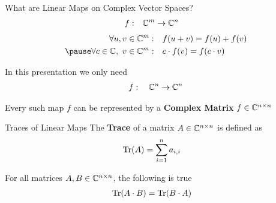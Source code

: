 %

\begin{frame}{What are Linear Maps on Complex Vector Spaces?}
    \Large
    \begin{align*}
        f: \quad & \mathbb{C}^m \to \mathbb{C}^n
    \end{align*}
    \large
    \pause
    \begin{align*}
        \forall u, v \in \C^m: \quad & f(u + v) = f(u) + f(v) \\ \pause
        \forall c \in \C,\ v \in \C^m: \quad & c \cdot f(v) = f(c \cdot v)
    \end{align*}
    
    \pause
    In this presentation we only need
    \Large
    \begin{align*}
        f: \quad \mathbb{C}^n \to \mathbb{C}^n
    \end{align*}

    \large
    \pause
    Every such map $f$ can be represented by a \textbf{Complex Matrix} $f \in \mathbb{C}^{n \times n}$
    \vspace{2em}
\end{frame}

\begin{frame}{Traces of Linear Maps}
    The \textbf{Trace} of a matrix $A \in \mathbb{C}^{n \times n}$ is defined as
    \pause
    \begin{align*}
        \operatorname{Tr}(A) & = \sum_{i = 1}^n a_{i, i}
    \end{align*}
    
    \pause
    For all matrices $A, B \in \mathbb{C}^{n \times n}$, the following is true
    \begin{align*}
        \operatorname{Tr}(A \cdot B) & = \operatorname{Tr}(B \cdot A)
    \end{align*}
\end{frame}

